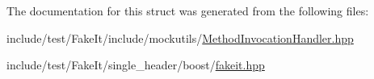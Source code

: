 The documentation for this struct was generated from the following files\+:\begin{DoxyCompactItemize}
\item 
include/test/\+Fake\+It/include/mockutils/\mbox{\hyperlink{MethodInvocationHandler_8hpp}{Method\+Invocation\+Handler.\+hpp}}\item 
include/test/\+Fake\+It/single\+\_\+header/boost/\mbox{\hyperlink{single__header_2boost_2fakeit_8hpp}{fakeit.\+hpp}}\end{DoxyCompactItemize}
